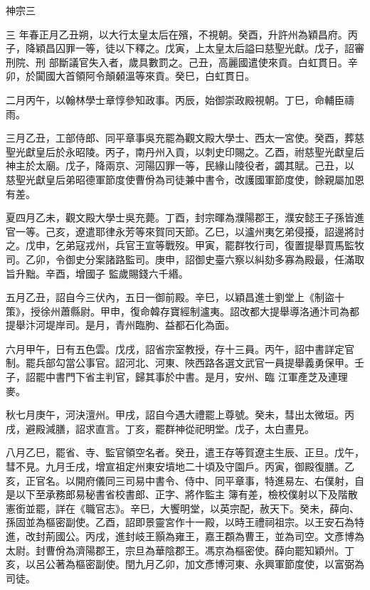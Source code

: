 
\begin{pinyinscope}

 神宗三



 三
 年春正月乙丑朔，以大行太皇太后在殯，不視朝。癸酉，升許州為穎昌府。丙子，降穎昌囚罪一等，徒以下釋之。戊寅，上太皇太后謚曰慈聖光獻。戊子，詔審刑院、刑
 部斷議官失入者，歲具數罰之。己丑，高麗國遣使來貢。白虹貫日。辛卯，於闐國大首領阿令顛顙溫等來貢。癸巳，白虹貫日。



 二月丙午，以翰林學士章惇參知政事。丙辰，始御崇政殿視朝。丁巳，命輔臣禱雨。



 三月乙丑，工部侍郎、同平章事吳充罷為觀文殿大學士、西太一宮使。癸酉，葬慈聖光獻皇后於永昭陵。丙子，南丹州入貢，以刺史印賜之。乙酉，祔慈聖光獻皇后神主於太廟。戊子，降兩京、河陽囚罪一等，民緣山陵役者，蠲其賦。己丑，以
 慈聖光獻皇后弟昭德軍節度使曹佾為司徒兼中書令，改護國軍節度使，餘親屬加恩有差。



 夏四月乙未，觀文殿大學士吳充薨。丁酉，封宗暉為濮陽郡王，濮安懿王子孫皆進官一等。己亥，遼遣耶律永芳等來賀同天節。乙巳，以瀘州夷乞弟侵擾，詔邊將討之。戊申，乞弟寇戎州，兵官王宣等戰歿。甲寅，罷群牧行司，復置提舉買馬監牧司。乙卯，令御史分案諸路監司。庚申，詔御史臺六察以糾劾多寡為殿最，任滿取旨升黜。辛酉，增國子
 監歲賜錢六千緡。



 五月乙丑，詔自今三伏內，五日一御前殿。辛巳，以穎昌進士劉堂上《制盜十策》，授徐州蕭縣尉。甲申，復命韓存寶經制瀘夷。詔改都大提舉導洛通汴司為都提舉汴河堤岸司。是月，青州臨朐、益都石化為面。



 六月甲午，日有五色雲。戊戌，詔省宗室教授，存十三員。丙午，詔中書詳定官制。罷兵部勾當公事官。詔河北、河東、陜西路各選文武官一員提舉義勇保甲。壬子，詔罷中書門下省主判官，歸其事於中書。是月，安州、臨
 江軍產芝及連理麥。



 秋七月庚午，河決澶州。甲戌，詔自今遇大禮罷上尊號。癸未，彗出太微垣。丙戌，避殿減膳，詔求直言。丁亥，罷群神從祀明堂。戊子，太白晝見。



 八月乙巳，罷省、寺、監官領空名者。癸丑，遣王存等賀遼主生辰、正旦。戊午，彗不見。九月壬戌，增宣祖定州東安墳地二十頃及守園戶。丙寅，御殿復膳。乙亥，正官名。以開府儀同三司易中書令、侍中、同平章事，特進易左、右僕射，自是以下至承務郎易秘書省校書郎、正字、將作監主
 簿有差，檢校僕射以下及階散憲銜並罷，詳在《職官志》。辛巳，大饗明堂，以英宗配，赦天下。癸未，薛向、孫固並為樞密副使。乙酉，詔即景靈宮作十一殿，以時王禮祠祖宗。以王安石為特進，改封荊國公。丙戌，進封岐王顥為雍王，嘉王頵為曹王，並為司空。文彥博為太尉。封曹佾為濟陽郡王，宗旦為華陰郡王。馮京為樞密使。薛向罷知穎州。丁亥，以呂公著為樞密副使。閏九月乙卯，加文彥博河東、永興軍節度使，以富弼為司徒。




\end{pinyinscope}
